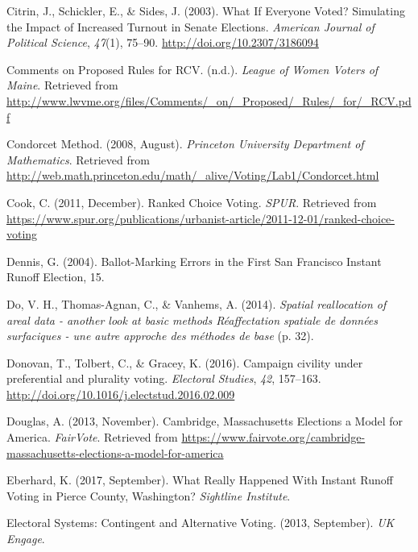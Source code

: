 \documentclass[12pt,twoside]{reedthesis}
\begin{document}
\leavevmode\hypertarget{ref-citrin_what_2003}{}%
Citrin, J., Schickler, E., \& Sides, J. (2003). What If Everyone Voted? Simulating the Impact of Increased Turnout in Senate Elections. \emph{American Journal of Political Science}, \emph{47}(1), 75--90. \url{http://doi.org/10.2307/3186094}

\leavevmode\hypertarget{ref-noauthor_comments_nodate}{}%
Comments on Proposed Rules for RCV. (n.d.). \emph{League of Women Voters of Maine}. Retrieved from \url{http://www.lwvme.org/files/Comments/_on/_Proposed/_Rules/_for/_RCV.pdf}

\leavevmode\hypertarget{ref-noauthor_condorcet_2008}{}%
Condorcet Method. (2008, August). \emph{Princeton University Department of Mathematics}. Retrieved from \url{http://web.math.princeton.edu/math/_alive/Voting/Lab1/Condorcet.html}

\leavevmode\hypertarget{ref-cook_ranked_2011}{}%
Cook, C. (2011, December). Ranked Choice Voting. \emph{SPUR}. Retrieved from \url{https://www.spur.org/publications/urbanist-article/2011-12-01/ranked-choice-voting}

\leavevmode\hypertarget{ref-dennis_ballot-marking_2004}{}%
Dennis, G. (2004). Ballot-Marking Errors in the First San Francisco Instant Runoff Election, 15.

\leavevmode\hypertarget{ref-do_spatial_2014}{}%
Do, V. H., Thomas-Agnan, C., \& Vanhems, A. (2014). \emph{Spatial reallocation of areal data - another look at basic methods Réaffectation spatiale de données surfaciques - une autre approche des méthodes de base} (p. 32).

\leavevmode\hypertarget{ref-donovan_campaign_2016}{}%
Donovan, T., Tolbert, C., \& Gracey, K. (2016). Campaign civility under preferential and plurality voting. \emph{Electoral Studies}, \emph{42}, 157--163. \url{http://doi.org/10.1016/j.electstud.2016.02.009}

\leavevmode\hypertarget{ref-douglas_cambridge_2013}{}%
Douglas, A. (2013, November). Cambridge, Massachusetts Elections a Model for America. \emph{FairVote}. Retrieved from \url{https://www.fairvote.org/cambridge-massachusetts-elections-a-model-for-america}

\leavevmode\hypertarget{ref-eberhard_what_2017}{}%
Eberhard, K. (2017, September). What Really Happened With Instant Runoff Voting in Pierce County, Washington? \emph{Sightline Institute}.

\leavevmode\hypertarget{ref-noauthor_electoral_2013}{}%
Electoral Systems: Contingent and Alternative Voting. (2013, September). \emph{UK Engage}.
\end{document}

